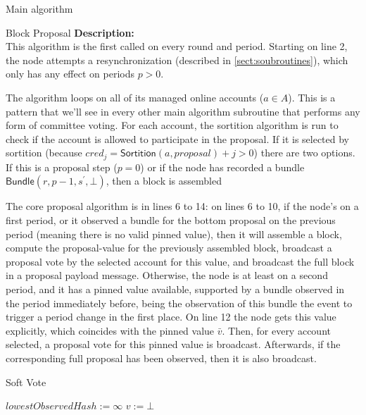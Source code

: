 \documentclass[10pt,a4paper]{article}
\begin{document}
\begin{section}{Main algorithm}
\begin{subsection}{Block Proposal}
\newpage
\noindent \textbf{Description:}\\
This algorithm is the first called on every round and period. 
Starting on line 2, the node attempts a resynchronization (described in \ref{sect:soubroutines}), which
only has any effect on periods $p > 0$.

The algorithm loops on all of its managed online accounts ($a\in A$). 
This is a pattern that we'll see in every other main algorithm subroutine 
that performs any form of committee voting.
For each account, the sortition algorithm is run to check if the account is allowed 
to participate in the proposal. 
If it is selected by sortition (because $cred_j=\mathsf{Sortition}(a, proposal)+j>0$)
there are two options. 
If this is a proposal step ($p=0$) or if the node has recorded a bundle 
$\mathsf{Bundle}(r, p-1, s^\prime, \bot)$, then a block is assembled 


The core proposal algorithm is in lines 6 to 14: on lines 6 to 10, 
if the node's on a first period, or it observed a bundle for the bottom proposal on the previous 
period (meaning there is no valid pinned value), then it will assemble a block, compute the proposal-value for the 
previously assembled block, broadcast a proposal vote by the selected account for this value, and 
broadcast the full block in a proposal payload message.
Otherwise, the node is at least on a second period, and it has a pinned value available, supported by a 
bundle observed in the period immediately before, being the observation of this bundle the event to trigger 
a period change in the first place. On line 12 the node gets this value explicitly, which coincides with the pinned
value $\bar{v}$. 
Then, for every account selected, a proposal vote for this pinned value is broadcast. Afterwards, 
if the corresponding full proposal has been observed, then it is also broadcast.


\end{subsection}
\begin{subsection}{Soft Vote}\label{ssect:softvote}

\begin{algorithm}[H]
    \caption{\underline{Soft Vote}}
    \label{algo:soft-vote}
    \begin{algorithmic}[1]
    \State $lowestObservedHash := \infty$
    \State $v := \bot$ 


\end{algorithmic}
\end{algorithm}
\end{subsection}
\end{section}
\end{document}
